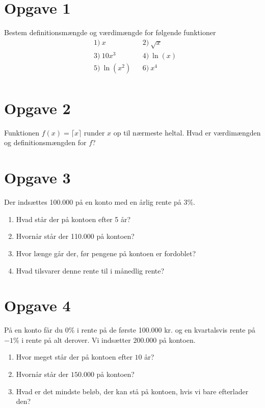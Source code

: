 \section*{Opgave 1}
Bestem definitionsmængde og værdimængde for følgende funktioner
\begin{align*}
&1) \ x  &&2) \ \sqrt{x}  \\
&3) \ 10x^3  &&4) \ \ln(x)  \\
&5) \  \ln(x^2) &&6) \ x^4   \\
\end{align*}
\section*{Opgave 2}
Funktionen $f(x) = \lceil x \rceil$ runder $x$ op til nærmeste heltal. Hvad er værdimængden og definitionsmængden for $f$?

\section*{Opgave 3}
Der indsættes 100.000 på en konto med en årlig rente på $3\%$. 
\begin{enumerate}[label=\roman*)]
\item Hvad står der på kontoen efter 5 år?
\item Hvornår står der 110.000 på kontoen?
\item Hvor længe går der, før pengene på kontoen er fordoblet?
\item Hvad tilsvarer denne rente til i månedlig rente?
\end{enumerate}
\section*{Opgave 4}
På en konto får du $0\%$ i rente på de første 100.000 kr. og en kvartalsvis rente på $-1\%$ i rente på alt derover. Vi indsætter $200.000$ på kontoen.
\begin{enumerate}[label=\roman*)]
\item Hvor meget står der på kontoen efter $10$ år?
\item Hvornår står der $150.000$ på kontoen?
\item Hvad er det mindste beløb, der kan stå på kontoen, hvis vi bare efterlader den?
\end{enumerate}
